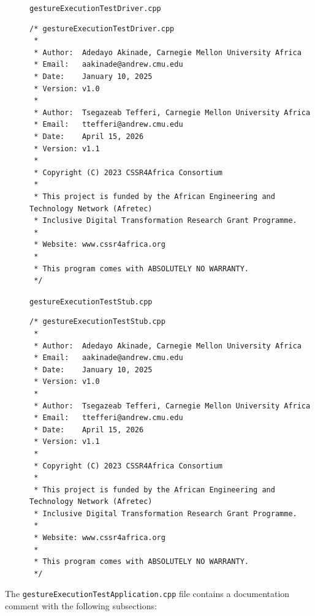 \documentclass{CSSRforAfrica}
\newcommand{\blank}{~\\}
\newcommand{\checkboxChecked}{\fbox{\ding{51}}} %
\begin{document}
\begin{description}
\item[\checkboxChecked] {\small \verb+gestureExecutionTestDriver.cpp+}  
{\small \begin{verbatim}
/* gestureExecutionTestDriver.cpp
 *
 * Author:  Adedayo Akinade, Carnegie Mellon University Africa
 * Email:   aakinade@andrew.cmu.edu
 * Date:    January 10, 2025
 * Version: v1.0
 *
 * Author:  Tsegazeab Tefferi, Carnegie Mellon University Africa
 * Email:   ttefferi@andrew.cmu.edu
 * Date:    April 15, 2026
 * Version: v1.1
 *
 * Copyright (C) 2023 CSSR4Africa Consortium
 *
 * This project is funded by the African Engineering and Technology Network (Afretec)
 * Inclusive Digital Transformation Research Grant Programme.
 *
 * Website: www.cssr4africa.org
 *
 * This program comes with ABSOLUTELY NO WARRANTY.
 */
\end{verbatim} }

\item[\checkboxChecked]  {\small \verb+gestureExecutionTestStub.cpp+}  
{\small \begin{verbatim}
/* gestureExecutionTestStub.cpp
 *
 * Author:  Adedayo Akinade, Carnegie Mellon University Africa
 * Email:   aakinade@andrew.cmu.edu
 * Date:    January 10, 2025
 * Version: v1.0
 *
 * Author:  Tsegazeab Tefferi, Carnegie Mellon University Africa
 * Email:   ttefferi@andrew.cmu.edu
 * Date:    April 15, 2026
 * Version: v1.1
 *
 * Copyright (C) 2023 CSSR4Africa Consortium
 *
 * This project is funded by the African Engineering and Technology Network (Afretec)
 * Inclusive Digital Transformation Research Grant Programme.
 *
 * Website: www.cssr4africa.org
 *
 * This program comes with ABSOLUTELY NO WARRANTY.
 */
\end{verbatim} }

\end{description} 
%
\noindent The {\small \verb+gestureExecutionTestApplication.cpp+} file contains a documentation comment with the following subsections:
\end{document}
